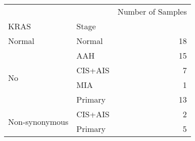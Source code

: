 \begin{tabular}{l|lr}
\toprule
               &         & Number of Samples \\
KRAS & Stage &                   \\
\midrule
Normal & Normal &                18 \\
\multirow{4}{*}{No} & AAH &                15 \\
               & CIS+AIS &                 7 \\
               & MIA &                 1 \\
               & Primary &                13 \\
\cline{1-3}
\multirow{2}{*}{Non-synonymous} & CIS+AIS &                 2 \\
               & Primary &                 5 \\
\bottomrule
\end{tabular}
